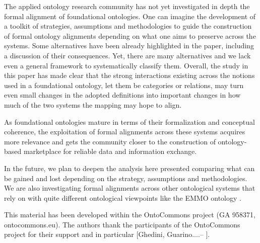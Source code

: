\documentclass[ao]{iosart2x}
\begin{document}
The applied ontology research community has not yet investigated in depth the formal alignment of foundational ontologies. One can imagine the development of a toolkit of strategies, assumptions and methodologies to guide the construction of formal ontology alignments depending on what one aims to preserve across the systems. Some alternatives have been already highlighted in the paper, including a discussion of their consequences. Yet, there are many alternatives and we lack even a general framework to systematically classify them. 
Overall, the study in this paper has made clear that the strong interactions existing across the notions used in a foundational ontology, let them be categories or relations, may turn even small changes in the adopted definitions into important changes in how much of the two systems the mapping may hope to align.

As foundational ontologies mature in terms of their formalization and conceptual coherence, the exploitation of formal alignments across these systems acquires more relevance and gets the community closer to the construction of ontology-based marketplace for reliable data and information exchange.

In the future, we plan to deepen the analysis here presented comparing what can be gained and lost depending on the strategy, assumptions and methodologies. We are also investigating formal alignments across other ontological systems that rely on with quite different ontological viewpoints like the EMMO ontology \citep{EMMO}.


\begin{acks}
This material has been developed within the OntoCommons project (GA 958371, ontocommons.eu). The authors thank the participants of the OntoCommons project for their support and in particular [Ghedini, Guarino....-- {\color{red}{Claudio fai tu una lista}}].
\end{acks}

\nocite{label} 


\end{document}
